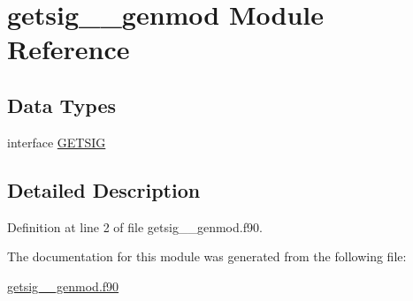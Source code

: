 \hypertarget{classgetsig____genmod}{\section{getsig\+\_\+\+\_\+genmod Module Reference}
\label{classgetsig____genmod}
}
\subsection*{Data Types}
\begin{DoxyCompactItemize}
\item 
interface \hyperlink{interfacegetsig____genmod_1_1GETSIG}{G\+E\+T\+S\+I\+G}
\end{DoxyCompactItemize}


\subsection{Detailed Description}


Definition at line 2 of file getsig\+\_\+\+\_\+genmod.\+f90.



The documentation for this module was generated from the following file\+:\begin{DoxyCompactItemize}
\item 
\hyperlink{getsig____genmod_8f90}{getsig\+\_\+\+\_\+genmod.\+f90}\end{DoxyCompactItemize}

